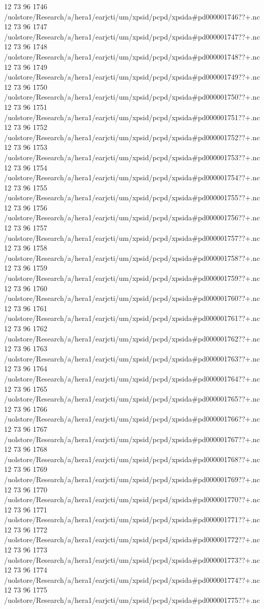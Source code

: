 12 73 96
1746
/uolstore/Research/a/hera1/earjcti/um/xpsid/pcpd/xpsida#pd000001746??+.nc
12 73 96
1747
/uolstore/Research/a/hera1/earjcti/um/xpsid/pcpd/xpsida#pd000001747??+.nc
12 73 96
1748
/uolstore/Research/a/hera1/earjcti/um/xpsid/pcpd/xpsida#pd000001748??+.nc
12 73 96
1749
/uolstore/Research/a/hera1/earjcti/um/xpsid/pcpd/xpsida#pd000001749??+.nc
12 73 96
1750
/uolstore/Research/a/hera1/earjcti/um/xpsid/pcpd/xpsida#pd000001750??+.nc
12 73 96
1751
/uolstore/Research/a/hera1/earjcti/um/xpsid/pcpd/xpsida#pd000001751??+.nc
12 73 96
1752
/uolstore/Research/a/hera1/earjcti/um/xpsid/pcpd/xpsida#pd000001752??+.nc
12 73 96
1753
/uolstore/Research/a/hera1/earjcti/um/xpsid/pcpd/xpsida#pd000001753??+.nc
12 73 96
1754
/uolstore/Research/a/hera1/earjcti/um/xpsid/pcpd/xpsida#pd000001754??+.nc
12 73 96
1755
/uolstore/Research/a/hera1/earjcti/um/xpsid/pcpd/xpsida#pd000001755??+.nc
12 73 96
1756
/uolstore/Research/a/hera1/earjcti/um/xpsid/pcpd/xpsida#pd000001756??+.nc
12 73 96
1757
/uolstore/Research/a/hera1/earjcti/um/xpsid/pcpd/xpsida#pd000001757??+.nc
12 73 96
1758
/uolstore/Research/a/hera1/earjcti/um/xpsid/pcpd/xpsida#pd000001758??+.nc
12 73 96
1759
/uolstore/Research/a/hera1/earjcti/um/xpsid/pcpd/xpsida#pd000001759??+.nc
12 73 96
1760
/uolstore/Research/a/hera1/earjcti/um/xpsid/pcpd/xpsida#pd000001760??+.nc
12 73 96
1761
/uolstore/Research/a/hera1/earjcti/um/xpsid/pcpd/xpsida#pd000001761??+.nc
12 73 96
1762
/uolstore/Research/a/hera1/earjcti/um/xpsid/pcpd/xpsida#pd000001762??+.nc
12 73 96
1763
/uolstore/Research/a/hera1/earjcti/um/xpsid/pcpd/xpsida#pd000001763??+.nc
12 73 96
1764
/uolstore/Research/a/hera1/earjcti/um/xpsid/pcpd/xpsida#pd000001764??+.nc
12 73 96
1765
/uolstore/Research/a/hera1/earjcti/um/xpsid/pcpd/xpsida#pd000001765??+.nc
12 73 96
1766
/uolstore/Research/a/hera1/earjcti/um/xpsid/pcpd/xpsida#pd000001766??+.nc
12 73 96
1767
/uolstore/Research/a/hera1/earjcti/um/xpsid/pcpd/xpsida#pd000001767??+.nc
12 73 96
1768
/uolstore/Research/a/hera1/earjcti/um/xpsid/pcpd/xpsida#pd000001768??+.nc
12 73 96
1769
/uolstore/Research/a/hera1/earjcti/um/xpsid/pcpd/xpsida#pd000001769??+.nc
12 73 96
1770
/uolstore/Research/a/hera1/earjcti/um/xpsid/pcpd/xpsida#pd000001770??+.nc
12 73 96
1771
/uolstore/Research/a/hera1/earjcti/um/xpsid/pcpd/xpsida#pd000001771??+.nc
12 73 96
1772
/uolstore/Research/a/hera1/earjcti/um/xpsid/pcpd/xpsida#pd000001772??+.nc
12 73 96
1773
/uolstore/Research/a/hera1/earjcti/um/xpsid/pcpd/xpsida#pd000001773??+.nc
12 73 96
1774
/uolstore/Research/a/hera1/earjcti/um/xpsid/pcpd/xpsida#pd000001774??+.nc
12 73 96
1775
/uolstore/Research/a/hera1/earjcti/um/xpsid/pcpd/xpsida#pd000001775??+.nc
